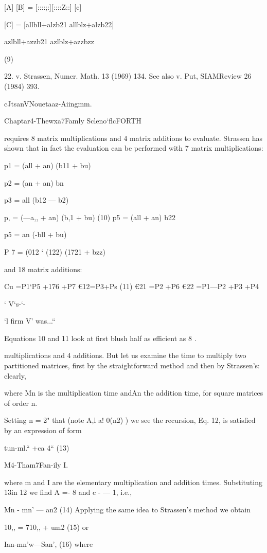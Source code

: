 {{{{{{{{{{{{{{{{[A] [B] = [::::;:][::::Z::] [c]

[C] = [allbll+alzb21 allblz+alzb22]

azlbll+azzb21 azlblz+azzbzz

(9)

 

22. v. Strassen, Numer. Math. 13 (1969) 134. See also v. Put, SIAMReview 26 (1984) 393.

cJtsanVNouetaaz-Aiingmm.

Chaptar4-Thewxa7Famly Scleno‘flcFORTH

requires 8 matrix multiplications and 4 matrix additions to
evaluate. Strassen has shown that in fact the evaluation can be
performed with 7 matrix multiplications:

p1 = (all + an) (b11 + bu)

p2 = (an + an) bn

p3 = all (b12 — b2)

p, = (—a,, + an) (b,1 + bu) (10)
p5 = (all + an) b22

p5 = an (-bll + bu)

P 7 = (012 ‘ (122) (1721 + bzz)

and 18 matrix additions:

Cu =P1‘P5 +176 +P7
€12=P3+Ps
(11)
€21 =P2 +P6
€22 =P1—P2 +P3 +P4

‘ V‘s-‘-

‘l firm V' was...“

Equations 10 and 11 look at first blush half as efficient as 8 .

multiplications and 4 additions. But let us examine the time to
multiply two partitioned matrices, first by the straightforward
method and then by Strassen's: clearly,

where Mn is the multiplication time andAn the addition time, for
square matrices of order n.

Setting n = 2" that (note A,l a! 0(n2) ) we see the recursion,
Eq. 12, is satisfied by an expression of form

tun-ml.“ +ca 4“ (13)

M4-Tham7Fan-ily I.

where m and I are the elementary multiplication and addition
times. Substituting 13in 12 we find A =- 8 and c - — 1, i.e.,

Mn - mn’ — an2 (14)
Applying the same idea to Strassen’s method we obtain

10,, = 710,, + um2 (15)
or

Ian-mn’w—San’, (16)
where

}}}}}}}}}}}}}}}}
